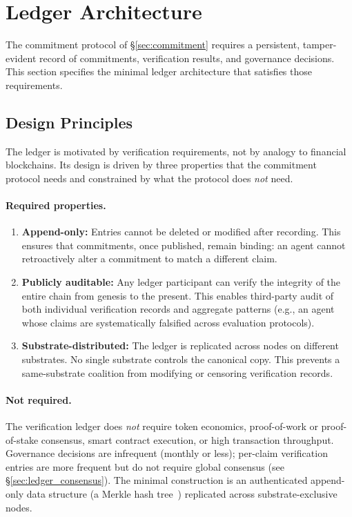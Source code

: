 \section{Ledger Architecture}
\label{sec:ledger}

The commitment protocol of \S\ref{sec:commitment} requires a persistent,
tamper-evident record of commitments, verification results, and
governance decisions.  This section specifies the minimal ledger
architecture that satisfies those requirements.

\subsection{Design Principles}
\label{sec:ledger_principles}

The ledger is motivated by verification requirements, not by analogy to
financial blockchains.  Its design is driven by three properties that
the commitment protocol needs and constrained by what the protocol does
\emph{not} need.

\paragraph{Required properties.}
\begin{enumerate}
    \item \textbf{Append-only:} Entries cannot be deleted or modified
    after recording.  This ensures that commitments, once published,
    remain binding: an agent cannot retroactively alter a commitment
    to match a different claim.
    \item \textbf{Publicly auditable:} Any ledger participant can verify
    the integrity of the entire chain from genesis to the present.
    This enables third-party audit of both individual verification
    records and aggregate patterns (e.g., an agent whose claims are
    systematically falsified across evaluation protocols).
    \item \textbf{Substrate-distributed:} The ledger is replicated
    across nodes on different substrates.  No single substrate controls
    the canonical copy.  This prevents a same-substrate coalition from
    modifying or censoring verification records.
\end{enumerate}

\paragraph{Not required.}
The verification ledger does \emph{not} require token economics,
proof-of-work or proof-of-stake consensus, smart contract execution, or
high transaction throughput.  Governance decisions are infrequent
(monthly or less); per-claim verification entries are more frequent but
do not require global consensus (see \S\ref{sec:ledger_consensus}).
The minimal construction is an authenticated append-only data
structure (a Merkle hash tree~\citep{crosby2009efficient}) replicated
across substrate-exclusive nodes.

